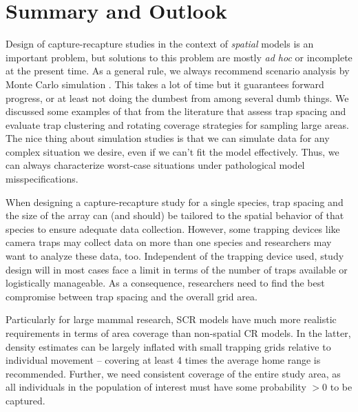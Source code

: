 \section {Summary and Outlook}
\label{design.sec.outlook}

Design of capture-recapture studies in the context of {\it spatial}
models is an important problem, but solutions to this problem are
mostly {\it ad hoc} or incomplete at the present time. As a general
rule, we always recommend scenario analysis by Monte Carlo simulation
\citep{efford_fewster:2012, sollmann_etal:2012, sun:2013}.  This takes
a lot of time but it guarantees forward progress, or at least not
doing the dumbest from among several dumb things.  We discussed some
examples of that from the literature that assess trap spacing and
evaluate trap clustering and rotating coverage strategies for sampling
large areas.  The nice thing about simulation studies is that we can
simulate data for any complex situation we desire, even if we can't
fit the model effectively. Thus, we can always characterize worst-case
situations under pathological model misspecifications.

When designing a capture-recapture study for a single species, trap
spacing and the size of the array can (and should) be tailored to the
spatial behavior of that species to ensure adequate data
collection. However, some trapping devices like camera traps may
collect data on more than one species and researchers may want to
analyze these data, too. Independent of the trapping device used,
study design will in most cases face a limit in terms of the number of
traps available or logistically manageable. As a consequence,
researchers need to find the best compromise between trap spacing and
the overall grid area.

Particularly for large mammal research, SCR models have much more
realistic requirements in terms of area coverage than non-spatial CR
models. In the latter, density estimates can be largely inflated with
small trapping grids relative to individual movement
\citep{maffei_noss:2008} -- covering at least 4 times the average home
range is recommended. Further, we need consistent coverage of the
entire study area, as all individuals in the population of interest
must have some probability $>0$ to be captured.

